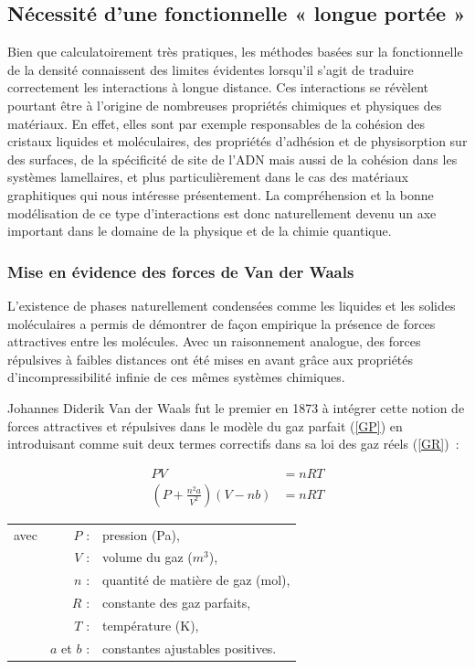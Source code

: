 \subsection{Nécessité d'une fonctionnelle « longue portée »}

Bien que calculatoirement très pratiques, les méthodes basées sur la fonctionnelle de la densité connaissent des limites évidentes lorsqu'il s'agit de traduire correctement les interactions à longue distance. Ces interactions se révèlent pourtant être à l'origine de nombreuses propriétés chimiques et physiques des matériaux. En effet, elles sont par exemple responsables de la cohésion des cristaux liquides et moléculaires, des propriétés d'adhésion et de physisorption sur des surfaces, de la spécificité de site de l'ADN mais aussi de la cohésion dans les systèmes lamellaires, et plus particulièrement dans le cas des matériaux graphitiques qui nous intéresse présentement. La compréhension et la bonne modélisation de ce type d'interactions est donc naturellement devenu un axe important dans le domaine de la physique et de la chimie quantique. 



\subsubsection{Mise en évidence des forces de Van der Waals}

L'existence de phases naturellement condensées comme les liquides et les solides moléculaires a permis de démontrer de façon empirique la présence de forces attractives entre les molécules. Avec un raisonnement analogue, des forces répulsives à faibles distances ont été mises en avant grâce aux propriétés d'incompressibilité infinie de ces mêmes systèmes chimiques.

Johannes Diderik Van der Waals fut le premier en 1873 à intégrer cette notion de forces attractives et répulsives dans le modèle du \og gaz parfait \fg{} (\ref{GP}) en introduisant comme suit deux termes correctifs dans sa loi des \og gaz réels \fg{} (\ref{GR})~:

\begin{align}
PV &= nRT \label{GP} \\
\left(P+\frac{n^{2}a}{V^{2}}\right)(V-nb) &= nRT \label{GR}
\end{align}

\begin{flushleft}
\begin{tabular}{@{}lrp{10cm}}
avec & $P$ : & pression (Pa), \\
& $V$ : & volume du gaz ($m^{3}$), \\    %
& $n$ : & quantité de matière de gaz (mol), \\
& $R$ : & constante des gaz parfaits, \\
& $T$ : & température (K), \\
& $a$ et $b$ : & constantes ajustables positives. 
\end{tabular}
\end{flushleft}

